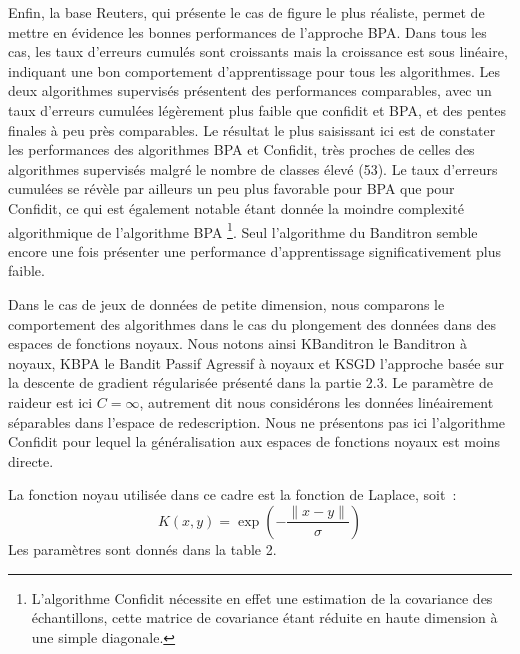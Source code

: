 \documentclass[preprint,12pt,authoryear]{elsarticle}
\begin{document}
Enfin, la base Reuters, qui présente le cas de figure le plus réaliste, permet de mettre en évidence les bonnes performances de l'approche BPA. Dans tous les cas, les taux d'erreurs cumulés sont croissants mais la croissance est sous linéaire, indiquant une bon comportement d'apprentissage pour tous les algorithmes. Les deux algorithmes supervisés présentent des performances comparables, avec un taux d'erreurs cumulées légèrement plus faible  que confidit et BPA, et des pentes finales à peu près comparables. Le résultat le plus saisissant ici est de constater les performances des algorithmes BPA et Confidit, très proches de celles des algorithmes supervisés malgré le nombre de classes élevé (53). Le taux d'erreurs cumulées se révèle par ailleurs un peu plus favorable pour BPA que pour Confidit, ce qui est également notable étant donnée la moindre complexité algorithmique de l'algorithme BPA \footnote{L'algorithme Confidit nécessite en effet une estimation de la covariance des échantillons, cette matrice de covariance étant réduite en haute dimension à une simple diagonale.}. Seul l'algorithme du Banditron semble encore une fois présenter une performance d'apprentissage significativement plus faible. 


Dans le cas de jeux de données de petite dimension, nous comparons le comportement des algorithmes dans le cas du plongement des données dans des espaces de fonctions noyaux. Nous notons ainsi KBanditron le Banditron à noyaux, KBPA le Bandit Passif Agressif à noyaux et KSGD l'approche basée sur la descente de gradient régularisée présenté dans la partie 2.3. Le paramètre de raideur est ici $C = \infty$, autrement dit nous considérons les données linéairement séparables dans l'espace de redescription. Nous ne présentons pas ici l'algorithme Confidit pour lequel la généralisation aux espaces de fonctions noyaux est moins directe. 

La fonction noyau utilisée dans ce cadre est la fonction de Laplace, soit~:
\[K(x,y) = \exp{\left(-\frac{\parallel{x-y}\parallel}{\sigma}\right)}\]
Les paramètres sont donnés dans la table 2. 
\end{document}
